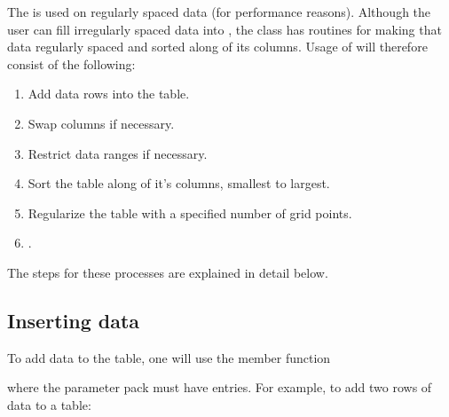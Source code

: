 \documentclass[letterpaper,10pt,english]{sphinxmanual}
\begin{document}
\sphinxAtStartPar
The  is used on regularly spaced data (for performance reasons).
Although the user can fill irregularly spaced data into , the class has routines for making that data regularly spaced and sorted along of its columns.
Usage of  will therefore consist of the following:
\begin{enumerate}
%
\item {} 
\sphinxAtStartPar
Add data rows into the table.

\item {} 
\sphinxAtStartPar
Swap columns if necessary.

\item {} 
\sphinxAtStartPar
Restrict data ranges if necessary.

\item {} 
\sphinxAtStartPar
Sort the table along of it’s columns, smallest to largest.

\item {} 
\sphinxAtStartPar
Regularize the table with a specified number of grid points.

\item {} 
\sphinxAtStartPar
{}.

\end{enumerate}

\sphinxAtStartPar
The steps for these processes are explained in detail below.


\subsection{Inserting data}
\label{\detokenize{Utilities/LookupTable:inserting-data}}
\sphinxAtStartPar
To add data to the table, one will use the member function

\begin{sphinxVerbatim}[commandchars=\\\{\},formatcom=\scriptsize]
  
   
\end{sphinxVerbatim}

\sphinxAtStartPar
where the parameter pack must have  entries.
For example, to add two rows of data to a table:
\end{document}
